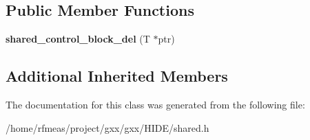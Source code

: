 \subsection*{Public Member Functions}
\begin{DoxyCompactItemize}
\item 
{\bfseries shared\+\_\+control\+\_\+block\+\_\+del} (T $\ast$ptr)\hypertarget{classgxx_1_1shared__control__block__del_af2ad77cdc74c8c58e08a3201d338ae68}{}\label{classgxx_1_1shared__control__block__del_af2ad77cdc74c8c58e08a3201d338ae68}

\end{DoxyCompactItemize}
\subsection*{Additional Inherited Members}


The documentation for this class was generated from the following file\+:\begin{DoxyCompactItemize}
\item 
/home/rfmeas/project/gxx/gxx/\+H\+I\+D\+E/shared.\+h\end{DoxyCompactItemize}
